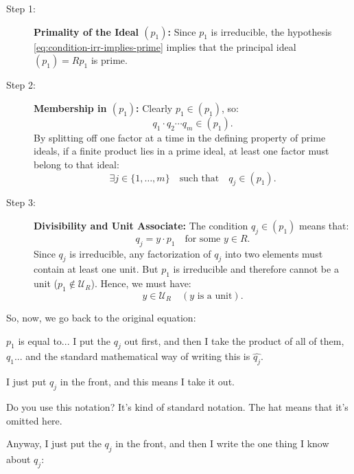 \begin{proofWrapper}
\begin{content}[Base Case of the Induction ($n = 1$)]
\begin{description}
    \item[Step 1:] \textbf{Primality of the Ideal $(p_1)$:} Since $p_1$ is irreducible, the hypothesis \eqref{eq:condition-irr-implies-prime} implies that the principal ideal $(p_1) = R p_1$ is prime.
    \item[Step 2:] \textbf{Membership in $(p_1)$:} Clearly $p_1 \in (p_1)$, so:
    \[
    q_1 \cdot q_2 \cdots q_m \in (p_1).
    \]
    By splitting off one factor at a time in the defining property of prime ideals, if a finite product lies in a prime ideal, at least one factor must belong to that ideal:
    \begin{equation}\label{eq:qj-in-p1}
    \exists j \in \{1, \dots, m\} \quad \text{such that} \quad q_j \in (p_1).
    \end{equation}
    \item[Step 3:] \textbf{Divisibility and Unit Associate:} The condition $q_j \in (p_1)$ means that:
    \begin{equation}\label{eq:qj-y-p1}
    q_j = y \cdot p_1 \quad \text{for some } y \in R.
    \end{equation}
    Since $q_j$ is irreducible, any factorization of $q_j$ into two elements must contain at least one unit. But $p_1$ is irreducible and therefore cannot be a unit ($p_1 \notin \mathcal{U}_R$). Hence, we must have:
    \begin{equation}\label{eq:y-is-unit}
    y \in \mathcal{U}_R \quad (y \text{ is a unit}).
    \end{equation}
\end{description}
\end{content}

\begin{speech}[00:39:17 - 00:41:44]
So, now, we go back to the original equation: 

$p_1$ is equal to... I put the $q_j$ out first, and then I take the product of all of them,  $q_1$... and the standard mathematical way of writing this is $\widehat{q_j}$. 

I just put $q_j$ in the front, and this means I take it out.

Do you use this notation? It's kind of standard notation. The hat means that it's omitted here.

Anyway, I just put the $q_j$ in the front, and then I write the one thing I know about $q_j$: 


\end{speech}
\end{proofWrapper}
